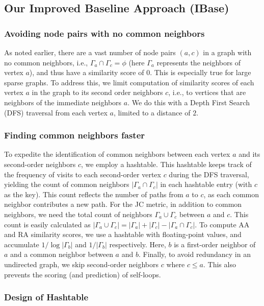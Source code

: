 \subsection{Our Improved Baseline Approach (IBase)}

\subsubsection{Avoiding node pairs with no common neighbors}

As noted earlier, there are a vast number of node pairs $(a, c)$ in a graph with no common neighbors, i.e., $\Gamma_a \cap \Gamma_c = \phi$ (here $\Gamma_a$ represents the neighbors of vertex $a$), and thus have a similarity score of $0$. This is especially true for large sparse graphs. To address this, we limit computation of similarity scores of each vertex $a$ in the graph to its second order neighbors $c$, i.e., to vertices that are neighbors of the immediate neighbors $a$. We do this with a Depth First Search (DFS) traversal from each vertex $a$, limited to a distance of $2$.


\subsubsection{Finding common neighbors faster}

To expedite the identification of common neighbors between each vertex $a$ and its second-order neighbors $c$, we employ a hashtable. This hashtable keeps track of the frequency of visits to each second-order vertex $c$ during the DFS traversal, yielding the count of common neighbors $|\Gamma_a \cap \Gamma_c|$ in each hashtable entry (with $c$ as the key). This count reflects the number of paths from $a$ to $c$, as each common neighbor contributes a new path. For the JC metric, in addition to common neighbors, we need the total count of neighbors $\Gamma_a \cup \Gamma_c$ between $a$ and $c$. This count is easily calculated as $|\Gamma_a \cup \Gamma_c| = |\Gamma_a| + |\Gamma_c| - |\Gamma_a \cap \Gamma_c|$. To compute AA and RA similarity scores, we use a hashtable with floating-point values, and accumulate $1/\log{|\Gamma_b|}$ and $1/|\Gamma_b|$ respectively. Here, $b$ is a first-order neighbor of $a$ and a common neighbor between $a$ and $b$. Finally, to avoid redundancy in an undirected graph, we skip second-order neighbors $c$ where $c \leq a$. This also prevents the scoring (and prediction) of self-loops.


\subsubsection{Design of Hashtable}


